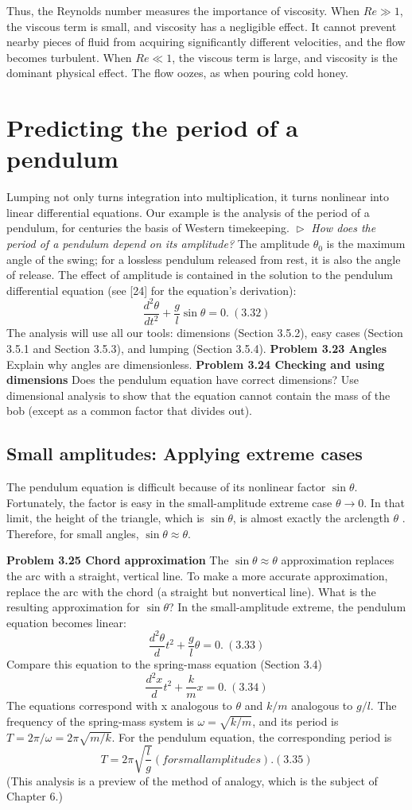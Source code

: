 \documentclass [a4paper] {book}
\begin{document}
 
\noindent Thus, the Reynolds number measures the importance of viscosity. When $Re\gg 1$, the viscous term is small, and viscosity has a negligible effect. It cannot prevent nearby pieces of fluid from acquiring significantly different velocities, and the flow becomes turbulent. When $Re \ll 1$, the viscous term is large, and viscosity is the dominant physical effect. The flow oozes, as when pouring cold honey.
\section{Predicting the period of a pendulum} 
Lumping not only turns integration into multiplication, it turns nonlinear into linear differential equations. Our example is the analysis of the period of a pendulum, for centuries the basis of Western timekeeping. 
\noindent $\vartriangleright$ \textit{How does the period of a pendulum depend on its amplitude?}
The amplitude $\theta_0$ is the maximum angle of the swing; for a lossless pendulum released from rest, it is also the angle of release. The effect of amplitude is contained in the solution to the pendulum differential equation (see [24] for the equation’s derivation): 
\[\frac{d^2\theta}{dt^2} + \frac{g}l\sin\theta = 0.~(3.32)\] 
The analysis will use all our tools: dimensions (Section 3.5.2), easy cases (Section 3.5.1 and Section 3.5.3), and lumping (Section 3.5.4).
\newpage
\noindent \textbf{Problem 3.23 Angles}
Explain why angles are dimensionless.
\textbf{Problem 3.24 Checking and using dimensions}
Does the pendulum equation have correct dimensions? Use dimensional analysis to show that the equation cannot contain the mass of the bob (except as a common factor that divides out).
\subsection{\textbf{ Small amplitudes: Applying extreme cases}}
The pendulum equation is difficult because of its nonlinear factor $\sin\theta$. Fortunately, the factor is easy in the small-amplitude extreme case $\theta \to 0$. In that limit, the height of the triangle, which is $\sin\theta$, is almost exactly the arclength $\theta$ . Therefore, for small angles, $\sin\theta \approx \theta$. 

\noindent \textbf{Problem 3.25 Chord approximation}
The $\sin\theta \approx \theta$ approximation replaces the arc with a straight, vertical line. To make a more accurate approximation, replace the arc with the chord (a straight but nonvertical  line). What is the resulting approximation for $\sin\theta$? 
In the small-amplitude extreme, the pendulum equation becomes linear: 
\[\frac{d^2\theta}dt^2 + \frac{g}l \theta = 0. ~(3.33)\] 
Compare this equation to the spring-mass equation (Section 3.4) 
\[\frac{d^2x}dt^2 + \frac{k}m x = 0. ~(3.34)\] 
The equations correspond with x analogous to $\theta$ and $k/m$ analogous to $g/l$. The frequency of the spring-mass system is $\omega = \sqrt{k/m}$, and its period is $T = 2\pi/\omega = 2\pi \sqrt{m/k}$. For the pendulum equation, the corresponding period is 
\[ T = 2\pi \sqrt{\frac {l}g} (for small amplitudes). (3.35)\]
(This analysis is a preview of the method of analogy, which is the subject of Chapter 6.)
\newpage
\end{document}

